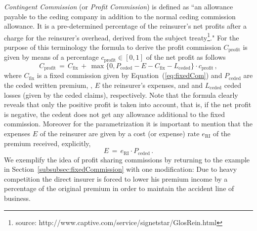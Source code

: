 {\em Contingent Commission} (or {\em Profit Commission}) is defined as ``an allowance payable to the ceding
company in addition to the normal ceding commission allowance. It is a pre-determined percentage of the reinsurer's
net profits after a charge for the reinsurer's overhead, derived from the subject
treaty\footnote{source: http://www.captive.com/service/signetstar/GlosRein.html}."
For the purpose of this terminology the formula to derive the profit commission $C_{\mathrm{profit}}$ is given
by means of a percentage $c_{\mathrm{profit}}\in [0,1]$ of the
net profit  as follows
\begin{equation}\label{eq:profitCom}
  C_{\mathrm{profit}}\,=\, C_{\mathrm{fix}}  \,+
  \,\max\big\{0,P_{\mathrm{ceded}}-E-C_{\mathrm{fix}}-L_{\mathrm{ceded}}\big\}\cdot c_{\mathrm{profit}}\,,
\end{equation}
where $C_{\mathrm{fix}}$ is a fixed commission given by Equation~(\ref{eq:fixedCom}) and
$P_{\mathrm{ceded}}$ are the ceded written premium,
$,\,E$ the reinsurer's expenses, and and $L_{\mathrm{ceded}}$ ceded losses (given by the ceded claims), respectively.
Note that the formula clearly reveals that only the
positive profit is taken into account, that is, if the net profit is negative,
the cedent does not get any allowance additional to the fixed commission.
Moreover for the parametrization it is important to mention that
the expenses $E$ of the reinsurer are given by a cost (or expense) rate $e_{\mathrm{RI}}$ of the
premium received, explicitly,
\begin{equation}\label{eq:expensesRI}
  E\,=\,e_{\mathrm{RI}}\cdot P_{\mathrm{ceded}}\,.
\end{equation}
We exemplify the idea of profit sharing commissions by returning to the example in 
Section~\ref{subsubsec:fixedCommission} with one modification:
Due to heavy competition the direct insurer is forced to lower his premium income by a percentage
of the original premium in order to maintain the accident line of business.

